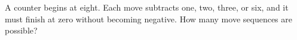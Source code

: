 A counter begins at eight. Each move subtracts one, two, three, or six, and it must finish at zero without becoming negative. How many move sequences are possible?
